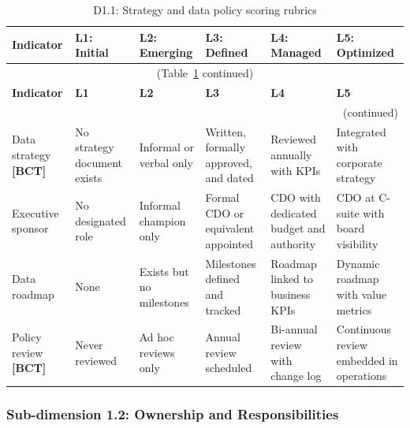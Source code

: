 \begin{center}
{\small
\begin{longtable}{|p{2.4cm}|p{2.0cm}|p{2.0cm}|p{2.2cm}|p{2.2cm}|p{2.2cm}|}
\caption{D1.1: Strategy and data policy scoring rubrics} \label{tab:d1-1} \\
\hline
\textbf{Indicator} & \textbf{L1: Initial} & \textbf{L2: Emerging} & \textbf{L3: Defined} & \textbf{L4: Managed} & \textbf{L5: Optimized} \\
\hline
\endfirsthead
\multicolumn{6}{c}{\small (Table~\ref{tab:d1-1} continued)} \\
\hline
\textbf{Indicator} & \textbf{L1} & \textbf{L2} & \textbf{L3} & \textbf{L4} & \textbf{L5} \\
\hline
\endhead
\hline
\multicolumn{6}{r}{\small (continued)} \\
\endfoot
\hline
\endlastfoot
Data strategy \textbf{[BCT]} &
  No strategy document exists &
  Informal or verbal only &
  Written, formally approved, and dated &
  Reviewed annually with KPIs &
  Integrated with corporate strategy \\
\hline
Executive sponsor &
  No designated role &
  Informal champion only &
  Formal CDO or equivalent appointed &
  CDO with dedicated budget and authority &
  CDO at C-suite with board visibility \\
\hline
Data roadmap &
  None &
  Exists but no milestones &
  Milestones defined and tracked &
  Roadmap linked to business KPIs &
  Dynamic roadmap with value metrics \\
\hline
Policy review \textbf{[BCT]} &
  Never reviewed &
  Ad hoc reviews only &
  Annual review scheduled &
  Bi-annual review with change log &
  Continuous review embedded in operations \\
\hline
\end{longtable}
}
\end{center}

\subsubsection*{Sub-dimension 1.2: Ownership and Responsibilities}

